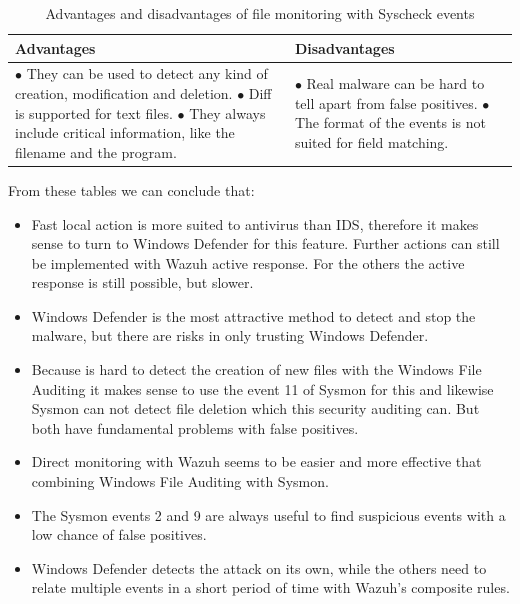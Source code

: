 \begin{table}[H]
	\begin{tabularx}{\textwidth}{|w|w|}
		\hline
		Advantages & Disadvantages\\ \hline
			$\bullet$ They can be used to detect any kind of creation, modification and deletion.
			\linej $\bullet$ Diff is supported for text files.
			\linej $\bullet$ They always include critical information, like the filename and the program.
		&
			$\bullet$ Real malware can be hard to tell apart from false positives.
			\linej $\bullet$ The format of the events is not suited for field matching.
			\\ \hline
	\end{tabularx}
	\caption{Advantages and disadvantages of file monitoring with Syscheck events}
\end{table}
\linej
From these tables we can conclude that:
\begin{itemize}
	\item Fast local action is more suited to antivirus than IDS, therefore it makes sense to turn to Windows Defender for this feature. Further actions can still be implemented with Wazuh active response. For the others the active response is still possible, but slower.
	\item Windows Defender is the most attractive method to detect and stop the malware, but there are risks in only trusting Windows Defender.
	\item Because is hard to detect the creation of new files with the Windows File Auditing it makes sense to use the event 11 of Sysmon for this and likewise Sysmon can not detect file deletion which this security auditing can. But both have fundamental problems with false positives.
	\item Direct monitoring with Wazuh seems to be easier and more effective that combining Windows File Auditing with Sysmon.
	\item The Sysmon events 2 and 9 are always useful to find suspicious events with a low chance of false positives.
	\item Windows Defender detects the attack on its own, while the others need to relate multiple events in a short period of time with Wazuh's composite rules.
\end{itemize}

